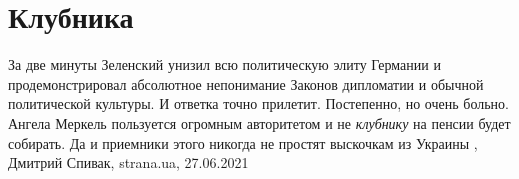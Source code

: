  
 
 
 
 
\chapter{Клубника}

За две минуты Зеленский унизил всю политическую элиту Германии и
продемонстрировал абсолютное непонимание Законов дипломатии и обычной
политической культуры.  И ответка точно прилетит. Постепенно, но очень больно.
Ангела Меркель пользуется огромным авторитетом и не \emph{клубнику} на пенсии
будет собирать.  Да и приемники этого никогда не простят выскочкам из Украины
, 
Дмитрий Спивак, strana.ua, 27.06.2021
